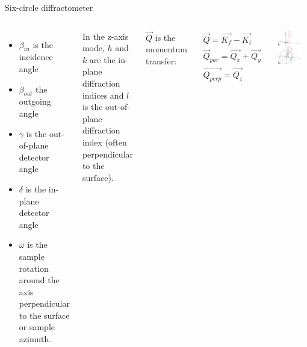 \begin{frame}{Six-circle diffractometer}

    \begin{columns}
    
        \begin{itemize}
            \item $\beta_{in}$ is the incidence angle
            \item $\beta_{out}$ the outgoing angle
            \item $\gamma$ is the out-of-plane detector angle
            \item $\delta$ is the in-plane detector angle
            \item $\omega$ is the sample rotation around the axis perpendicular to the surface or sample azimuth.
        \end{itemize}
        
        In the z-axis mode, $h$ and $k$ are  the in-plane diffraction indices and $l$ is the out-of-plane diffraction index (often perpendicular to the surface). 
        
        $\vec{Q}$ is  the  momentum  transfer: 
        
        \begin{gather}
            \vec{Q} = \Vec{K_f} - \Vec{K_i} \\
            \vec{Q}_{par} = \vec{Q_x} + \vec{Q_y} \\
            \vec{Q_{perp}} = \vec{Q_z}
        \end{gather}
    
        \centering
        \includegraphics[width=0.8\textwidth]{Figures/sxrd_data/diffracto.png}
    
    \end{columns}

\end{frame}


